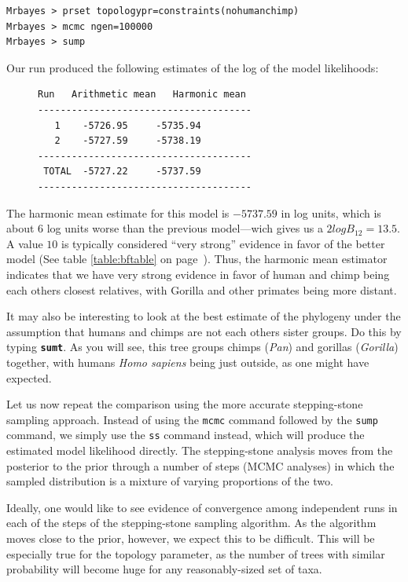 \documentclass[12pt]{book}
\newcommand{\ttt}[1]{\texttt{#1}}
\newcommand{\tb}[1]{\ttt{\textbf{#1}}}
\begin{document}
\begin{Verbatim}
Mrbayes > prset topologypr=constraints(nohumanchimp)
Mrbayes > mcmc ngen=100000
Mrbayes > sump
\end{Verbatim}

Our run produced the following estimates of the log of the model likelihoods:

\begin{figure}[h]
\centering
\begin{BVerbatim}
Run   Arithmetic mean   Harmonic mean
--------------------------------------
   1    -5726.95     -5735.94
   2    -5727.59     -5738.19
--------------------------------------
 TOTAL  -5727.22     -5737.59
--------------------------------------
\end{BVerbatim}
\end{figure}

The harmonic mean estimate for this model is $-5737.59$ in log units, which is about 6 log units
worse than the previous model---wich gives us a $2logB_{12} = 13.5$. A value $10$ is typically
considered ``very strong'' evidence in favor of the better model  (See table \ref{table:bftable}
on page~\pageref{table:bftable}). Thus, the harmonic mean estimator indicates that we have very
strong evidence in favor of human and chimp being each others closest relatives, with Gorilla
and other primates being more distant.

It may also be interesting to look at the best estimate of the phylogeny under the assumption that
humans and chimps are not each others sister groups. Do this by typing \tb{sumt}. As you will see,
this tree groups chimps (\textit{Pan}) and gorillas (\textit{Gorilla}) together, with humans
\textit{Homo sapiens} being just outside, as one might have expected.

Let us now repeat the comparison using the more accurate stepping-stone sampling approach. Instead
of using the \texttt{mcmc} command followed by the \texttt{sump} command, we simply use the
\texttt{ss} command instead, which will produce the estimated model likelihood directly. The
stepping-stone analysis moves from the posterior to the prior through a number of steps (MCMC
analyses) in which the sampled distribution is a mixture of varying proportions of the two.

Ideally, one would like to see evidence of convergence among independent runs in each of the steps
of the stepping-stone sampling algorithm. As the algorithm moves close to the prior, however, we
expect this to be difficult. This will be especially true for the topology parameter, as the number
of trees with similar probability will become huge for any reasonably-sized set of taxa.
\end{document}
